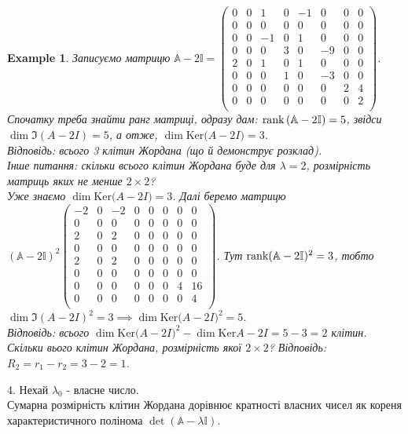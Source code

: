 \documentclass[a4paper, 10pt]{article}
\def\ker#1{\textrm{Ker} {#1}}
\theoremstyle{theoremdd}
\theoremstyle{theoremdd}
\theoremstyle{theoremdd}
\theoremstyle{theoremdd}
\newtheorem{example}[theorem]{Example}
\theoremstyle{theoremdd}
\theoremstyle{theoremdd}
\theoremstyle{theoremdd}
\theoremstyle{theoremdd}
\begin{document}
\begin{example}
Записуємо матрицю $\mathbb{A}-2 \mathbb{I} = \begin{pmatrix}
0 & 0 & 1 & 0 & -1 & 0 & 0 & 0 \\
0 & 0 & 0 & 0 & 0 & 0 & 0 & 0 \\
0 & 0 & -1 & 0 & 1 & 0 & 0 & 0 \\
0 & 0 & 0 & 3 & 0 & -9 & 0 & 0 \\
2 & 0 & 1 & 0 & 1 & 0 & 0 & 0 \\
0 & 0 & 0 & 1 & 0 & -3 & 0 & 0 \\
0 & 0 & 0 & 0 & 0 & 0 & 2 & 4 \\
0 & 0 & 0 & 0 & 0 & 0 & 0 & 2 \\
\end{pmatrix}$.\\
Спочатку треба знайти ранг матриці, одразу дам: $\rank \left(\mathbb{A}-2 \mathbb{I} \right) = 5$, звідси $\dim \Im (A-2I) = 5$, а отже, $\dim \ker (A-2I) = 3$.\\
Відповідь: всього 3 клітин Жордана (що й демонструє розклад).\\
Інше питання: скільки всього клітин Жордана буде для $\lambda = 2$, розмірність матриць яких не менше $2 \times 2$?\\
Уже знаємо $\dim \ker (A-2I) = 3$. Далі беремо матрицю $(\mathbb{A} - 2 \mathbb{I})^2 \begin{pmatrix}
-2 & 0 & -2 & 0 & 0 & 0 & 0 & 0 \\
0 & 0 & 0 & 0 & 0 & 0 & 0 & 0 \\
2 & 0 & 2 & 0 & 0 & 0 & 0 & 0 \\
0 & 0 & 0 & 0 & 0 & 0 & 0 & 0 \\
2 & 0 & 2 & 0 & 0 & 0 & 0 & 0 \\
0 & 0 & 0 & 0 & 0 & 0 & 0 & 0 \\
0 & 0 & 0 & 0 & 0 & 0 & 4 & 16 \\
0 & 0 & 0 & 0 & 0 & 0 & 0 & 4 \\
\end{pmatrix}$. Тут $\rank (\mathbb{A}-2 \mathbb{I})^2 = 3$, тобто $\dim \Im (A-2 I)^2 = 3 \implies \dim \ker (A-2I)^2 = 5$.\\
Відповідь: всього $\dim \ker (A-2I)^2 - \dim \ker A-2I = 5 - 3 = 2$ клітин.\\
Скільки вього клітин Жордана, розмірність якої $2 \times 2$? Відповідь: $R_2 = r_1 - r_2 = 3 - 2 = 1$.
\end{example}

4. Нехай $\lambda_0$ - власне число.\\
Сумарна розмірність клітин Жордана дорівнює кратності власних чисел як кореня характеристичного полінома $\det (\mathbb{A} - \lambda \mathbb{I})$.
\end{document}

